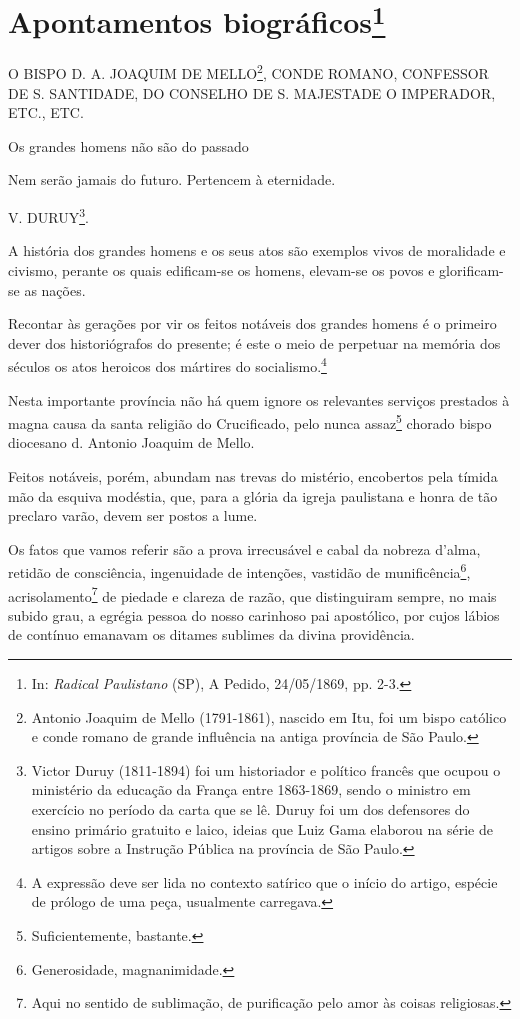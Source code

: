 \chapter{Apontamentos biográficos\footnote[*]{In: \emph{Radical
  Paulistano} (SP), A Pedido, 24/05/1869, pp. 2-3.}}


O BISPO D. A. JOAQUIM DE MELLO\footnote{Antonio Joaquim de Mello
  (1791-1861), nascido em Itu, foi um bispo católico e conde romano de
  grande influência na antiga província de São Paulo.}, CONDE ROMANO,
CONFESSOR DE S. SANTIDADE, DO CONSELHO DE S. MAJESTADE O IMPERADOR,
ETC., ETC.

Os grandes homens não são do passado

Nem serão jamais do futuro. Pertencem à eternidade.

V. DURUY\footnote{Victor Duruy (1811-1894) foi um historiador e
  político francês que ocupou o ministério da educação da França entre
  1863-1869, sendo o ministro em exercício no período da carta que se
  lê. Duruy foi um dos defensores do ensino primário gratuito e laico,
  ideias que Luiz Gama elaborou na série de artigos sobre a Instrução
  Pública na província de São Paulo.}.

A história dos grandes homens e os seus atos são exemplos vivos de
moralidade e civismo, perante os quais edificam-se os homens, elevam-se
os povos e glorificam-se as nações.

Recontar às gerações por vir os feitos notáveis dos grandes homens é o
primeiro dever dos historiógrafos do presente; é este o meio de
perpetuar na memória dos séculos os atos heroicos dos mártires do
socialismo.\footnote{A expressão deve ser lida no contexto satírico
  que o início do artigo, espécie de prólogo de uma peça, usualmente
  carregava.}

Nesta importante província não há quem ignore os relevantes serviços
prestados à magna causa da santa religião do Crucificado, pelo nunca
assaz\footnote{Suficientemente, bastante.} chorado bispo diocesano d.
Antonio Joaquim de Mello.

Feitos notáveis, porém, abundam nas trevas do mistério, encobertos pela
tímida mão da esquiva modéstia, que, para a glória da igreja paulistana
e honra de tão preclaro varão, devem ser postos a lume.

Os fatos que vamos referir são a prova irrecusável e cabal da nobreza
d'alma, retidão de consciência, ingenuidade de intenções, vastidão de
munificência\footnote{Generosidade, magnanimidade.},
acrisolamento\footnote{Aqui no sentido de sublimação, de purificação
  pelo amor às coisas religiosas.} de piedade e clareza de razão, que
distinguiram sempre, no mais subido grau, a egrégia pessoa do nosso
carinhoso pai apostólico, por cujos lábios de contínuo emanavam os
ditames sublimes da divina providência.

